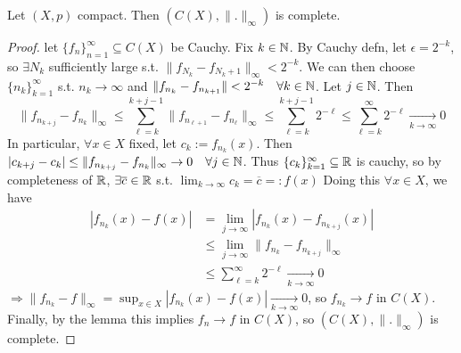 \begin{prop}
    Let $(X, p)$ compact. Then $(C(X), \| . \| _{\infty})$ is complete.
\end{prop}

\begin{proof}
    let $\{f_{n}\}_{n=1}^{\infty} \subseteq C(X)$ be Cauchy. Fix $k \in \mathbb{N}$. By Cauchy defn, let 
    $\epsilon = 2^{-k}$, so $ \exists N_k$ sufficiently large s.t. $\| f_{N_k} - f_{{N_k} + 1} \|_{\infty}
    < 2^{-k} $. We can then choose $\{n_{k}\}_{k=1}^{\infty} $ s.t. $n_k \to \infty$ and
    $\| f_{n_k} - f_{n_{k + 1}} \| < 2^{-k} \quad \forall k \in \mathbb{N}$. Let $j \in \mathbb{N}$. Then
    \[\| f_{n_{k + j}} - f_{n_k} \|_{\infty} \leq \sum_{\ell=k}^{k + j - 1} 
    \| f_{n_{\ell + 1}} - f_{n_\ell} \|_{\infty} \leq \sum_{\ell=k}^{k + j - 1} 2^{-\ell} \leq 
    \sum_{\ell=k}^{\infty} 2^{-\ell} \xrightarrow[k \to \infty]{} 0\]
    In particular, $\forall x \in X$ fixed, let $c_k := f_{n_k}(x)$. Then $\left| c_{k + j} - c_k \right| 
    \leq \| f_{n_{k + j}} - f_{n_k} \|_{\infty} \to 0 \quad \forall j \in \mathbb{N}$.
    Thus $\{c_{k}\}_{k=1}^{\infty} \subseteq \mathbb{R}$ is cauchy, so by completeness of $\mathbb{R}$,
    $\exists \overline{c} \in \mathbb{R}$ s.t. $\lim_{k \to \infty} c_k = \overline{c} =: f(x)$
    Doing this $\forall x \in X$, we have 
    \begin{align*}
        \left| f_{n_k}(x) - f(x) \right| 
        &= \lim_{j \to \infty} \left| f_{n_k}(x) - f_{n_{k + j}}(x) \right| \\
        &\leq \lim_{j \to \infty} \| f_{n_k} - f_{n_{k + j}} \|_{\infty} \\
        &\leq \sum_{\ell=k}^{\infty} 2^{-\ell} \xrightarrow[k \to \infty]{} 0
    \end{align*}
    $\Rightarrow \| f_{n_k} - f \|_{\infty} = \sup_{x \in X} \left| f_{n_k}(x) - f(x) \right|  
    \xrightarrow[k \to \infty]{} 0$, so $f_{n_k} \to f$ in $C(X)$. 
    Finally, by the lemma this implies $f_n \to f$ in $C(X)$, so
    $(C(X), \| . \|_{\infty} )$ is complete.            
\end{proof}

